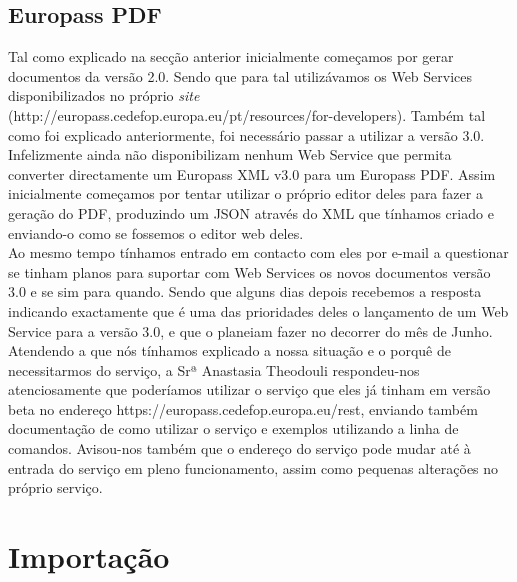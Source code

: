 \documentclass[a4paper,11pt,openright,openbib]{article}
\begin{document}
\subsection{Europass PDF}
Tal como explicado na secção anterior inicialmente começamos por gerar documentos da versão 2.0. Sendo que para tal utilizávamos os Web Services disponibilizados no próprio \emph{site} (http://europass.cedefop.europa.eu/pt/resources/for-developers). Também tal como foi explicado anteriormente, foi necessário passar a utilizar a versão 3.0. Infelizmente ainda não disponibilizam nenhum Web Service que permita converter directamente um Europass XML v3.0 para um Europass PDF. Assim inicialmente começamos por tentar utilizar o próprio editor deles para fazer a geração do PDF, produzindo um JSON através do XML que tínhamos criado e enviando-o como se fossemos o editor web deles.\\
Ao mesmo tempo tínhamos entrado em contacto com eles por e-mail a questionar se tinham planos para suportar com Web Services os novos documentos versão 3.0 e se sim para quando. Sendo que alguns dias depois recebemos a resposta indicando exactamente que é uma das prioridades deles o lançamento de um Web Service para a versão 3.0, e que o planeiam fazer no decorrer do mês de Junho. Atendendo a que nós tínhamos explicado a nossa situação e o porquê de necessitarmos do serviço, a Srª Anastasia Theodouli respondeu-nos atenciosamente que poderíamos utilizar o serviço que eles já tinham em versão beta no endereço https://europass.cedefop.europa.eu/rest, enviando também documentação de como utilizar o serviço e exemplos utilizando a linha de comandos. Avisou-nos também que o endereço do serviço pode mudar até à entrada do serviço em pleno funcionamento, assim como pequenas alterações no próprio serviço.
\section{Importação}
\end{document}
